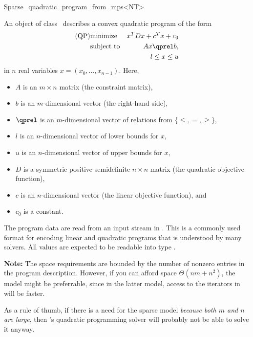 \begin{ccRefClass}{Sparse_quadratic_program_from_mps<NT>}


\ccDefinition
An object of class \ccRefName\ describes a convex quadratic program of the form
\begin{eqnarray*}
\mbox{(QP)}& \mbox{minimize} & x^{T}Dx+c^{T}x+c_0 \\
&\mbox{subject to}   & Ax\qprel b, \\
&                    & l \leq x \leq u
\end{eqnarray*}
in $n$ real variables $x=(x_0,\ldots,x_{n-1})$.
Here, 
\begin{itemize}
\item $A$ is an $m\times n$ matrix (the constraint matrix), 
\item $b$ is an $m$-dimensional vector (the right-hand side),
\item $\qprel$ is an $m$-dimensional vector of relations 
from $\{\leq, =, \geq\}$, 
\item $l$ is an $n$-dimensional vector of lower
bounds for $x$,
\item $u$ is an $n$-dimensional vector of upper bounds for
$x$, 
\item $D$ is a symmetric positive-semidefinite $n\times n$ matrix (the
  quadratic objective function),
\item $c$ is an $n$-dimensional vector (the linear objective
  function), and 
\item $c_0$ is a constant.
\end{itemize}

The program data are read from an input stream in . This is
a commonly used format for encoding linear and quadratic programs that
is understood by many solvers. All values are expected to be readable
into type .

\textbf{Note:} 
The space requirements are bounded by the number of nonzero entries
in the program description. However, if you can afford space
$\Theta(nm + n^2)$, the model 
might be preferrable, since in the latter model, access to the iterators 
in  will be faster.

As a rule of thumb, if there is a need for the sparse model
\emph{because both $m$ and $n$ are large}, then \cgal's quadratic
programming solver will probably not be able to solve it anyway.

\ccIsModel
{}


\end{ccRefClass}

